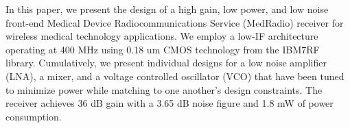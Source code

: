 In this paper, we present the design of a high gain, low power, and low noise front-end Medical Device Radiocommunications Service (MedRadio) receiver for wireless medical technology applications. We employ a low-IF architecture operating at 400 MHz using 0.18 um CMOS technology from the IBM7RF library. Cumulatively, we present individual designs for a low noise amplifier (LNA), a mixer, and a voltage controlled oscillator (VCO) that have been tuned to minimize power while matching to one another's design constraints. The receiver achieves 36 dB gain with a 3.65 dB noise figure and 1.8 mW of power consumption.